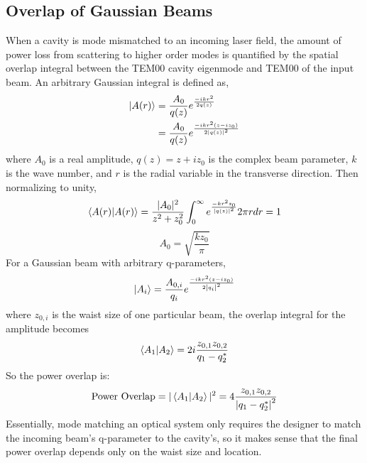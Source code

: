 \begin{appendices}
	\chapter{Overlap of Gaussian Beams}
	When a cavity is mode mismatched to an incoming laser field, the amount of power loss from scattering to higher order modes is quantified by the spatial overlap integral between the TEM00 cavity eigenmode and TEM00 of the input beam.
	An arbitrary Gaussian integral is defined as,
	\begin{equation}
	\begin{split}
	\ket{A(r)} 
	&= \frac{A_0}{q(z)} e^{\frac{-ikr^2}{2q(z)}}\\
	&= \frac{A_0}{q(z)} e^{\frac{-ikr^2(z-iz_0)}{2\abs{q(z)}^2}}
	\end{split}
	\end{equation}
	where $A_0$ is a real amplitude, $q(z)= z + i z_0$ is the complex beam parameter, $k$ is the wave number, and $r$ is the radial variable in the transverse direction. Then normalizing to unity,
	\begin{equation}
	\braket{A(r)|A(r)} 
	=  \frac{\rvert A_0 \rvert^2}{z^2+z_0^2} \int_{0}^{\infty} e^{\frac{-kr^2 z_0}{\abs{q(z)}^2}} 2 \pi r dr = 1
	\end{equation}
	\begin{equation}
	A_0 = \sqrt{\frac{k z_0}{\pi}}
	\end{equation}
	For a Gaussian beam with arbitrary q-parameters,
	\begin{equation}
	\ket{A_i} = \frac{A_{0,i}}{q_i} e^{ \frac{-ikr^2(z-iz_0)}{2\abs{q_i}^2 }}
	\end{equation}
	where $z_{0,i}$ is the waist size of one particular beam, the overlap integral for the amplitude becomes
	\begin{equation}
	\braket{A_1|A_2} = 2 i  \frac{ z_{0,1}z_{0,2}}{q_1 - q_2^*}
	\end{equation}
	So the power overlap is:
	\begin{equation}\label{gauss_power_ovl}
	\text{Power Overlap} = \vert \braket{A_1|A_2} \vert^2 = 4 \frac{ z_{0,1}z_{0,2}}{\abs{q_1 - q_2^*}^2}
	\end{equation}
	Essentially, mode matching an optical system only requires the designer to match the incoming beam's q-parameter to the cavity's, so it makes sense that the final power overlap depends only on the waist size and location.

\end{appendices} 

